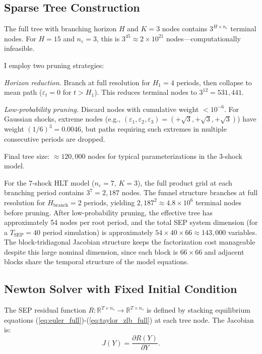 \documentclass[12pt]{article}
\theoremstyle{plain}
\theoremstyle{definition}
\theoremstyle{remark}
\newcommand{\R}{\mathbb{R}}
\newcommand{\eps}{\varepsilon}
\begin{document}
\subsection{Sparse Tree Construction}

The full tree with branching horizon $H$ and $K=3$ nodes contains $3^{H \times n_\eps}$ terminal nodes. For $H=15$ and $n_\eps=3$, this is $3^{45} \approx 2 \times 10^{21}$ nodes—computationally infeasible.

I employ two pruning strategies:

\textit{Horizon reduction.} Branch at full resolution for $H_1 = 4$ periods, then collapse to mean path ($\eps_t=0$ for $t > H_1$). This reduces terminal nodes to $3^{12} = 531{,}441$.

\textit{Low-probability pruning.} Discard nodes with cumulative weight $< 10^{-6}$. For Gaussian shocks, extreme nodes (e.g., $(\eps_1, \eps_2, \eps_3) = (+\sqrt{3}, +\sqrt{3}, +\sqrt{3})$) have weight $(1/6)^3 = 0.0046$, but paths requiring such extremes in multiple consecutive periods are dropped.

Final tree size: $\approx 120{,}000$ nodes for typical parameterizations in the 3-shock model.

For the 7-shock HLT model ($n_\eps = 7$, $K=3$), the full product grid at each branching period contains $3^7 = 2{,}187$ nodes. The funnel structure branches at full resolution for $H_{\text{branch}} = 2$ periods, yielding $2{,}187^2 \approx 4.8 \times 10^6$ terminal nodes before pruning. After low-probability pruning, the effective tree has approximately 54 nodes per root period, and the total SEP system dimension (for a $T_{\text{SEP}}=40$ period simulation) is approximately $54 \times 40 \times 66 \approx 143{,}000$ variables. The block-tridiagonal Jacobian structure keeps the factorization cost manageable despite this large nominal dimension, since each block is $66 \times 66$ and adjacent blocks share the temporal structure of the model equations.


\subsection{Newton Solver with Fixed Initial Condition}

The SEP residual function $R: \R^{T \times n_s} \to \R^{T \times n_s}$ is defined by stacking equilibrium equations (\ref{eq:euler_full})-(\ref{eq:taylor_zlb_full}) at each tree node. The Jacobian is:
\begin{equation}
J(Y) = \frac{\partial R(Y)}{\partial Y}.
\end{equation}
\end{document}

